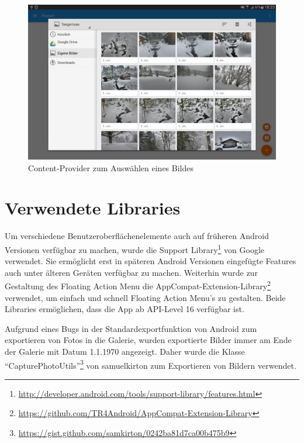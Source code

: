 \begin{figure}[H]
\centering
\includegraphics[scale=0.17]{images/screenshots/content_provider.png}
\caption{Content-Provider zum Auswählen eines Bildes}
\label{label:content_provider}
\end{figure}

\section{Verwendete Libraries}
Um verschiedene Benutzeroberflächenelemente auch auf früheren Android Versionen verfügbar zu machen, wurde die Support Library\footnote{\url{http://developer.android.com/tools/support-library/features.html}} von Google verwendet. Sie ermöglicht erst in späteren Android Versionen eingefügte Features auch unter älteren Geräten verfügbar zu machen. Weiterhin wurde zur Gestaltung des Floating Action Menu die AppCompat-Extension-Library\footnote{\url{https://github.com/TR4Android/AppCompat-Extension-Library}} verwendet, um einfach und schnell Floating Action Menu's zu gestalten. Beide Libraries ermöglichen, dass die App ab API-Level 16 verfügbar ist.

Aufgrund eines Bugs in der Standardexportfunktion von Android zum exportieren von Fotos in die Galerie, wurden exportierte Bilder immer am Ende der Galerie mit Datum 1.1.1970 angezeigt. Daher wurde die Klasse \enquote{CapturePhotoUtils}\footnote{\url{https://gist.github.com/samkirton/0242ba81d7ca00b475b9}} von samuelkirton zum Exportieren von Bildern verwendet.
